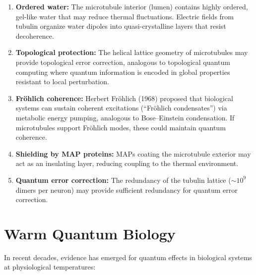 \documentclass[11pt,a4paper]{report}
\begin{document}
\begin{mechbox}
\begin{enumerate}[leftmargin=1.5em]
  \item \textbf{Ordered water:} The microtubule interior (lumen) contains highly ordered, gel-like water that may reduce thermal fluctuations. Electric fields from tubulin organize water dipoles into quasi-crystalline layers that resist decoherence.
  \item \textbf{Topological protection:} The helical lattice geometry of microtubules may provide topological error correction, analogous to topological quantum computing where quantum information is encoded in global properties resistant to local perturbation.
  \item \textbf{Fr\"ohlich coherence:} Herbert Fr\"ohlich (1968) proposed that biological systems can sustain coherent excitations (``Fr\"ohlich condensates'') via metabolic energy pumping, analogous to Bose--Einstein condensation. If microtubules support Fr\"ohlich modes, these could maintain quantum coherence.
  \item \textbf{Shielding by MAP proteins:} MAPs coating the microtubule exterior may act as an insulating layer, reducing coupling to the thermal environment.
  \item \textbf{Quantum error correction:} The redundancy of the tubulin lattice ($\sim 10^9$ dimers per neuron) may provide sufficient redundancy for quantum error correction.
\end{enumerate}
\end{mechbox}

\section{Warm Quantum Biology}

In recent decades, evidence has emerged for quantum effects in biological systems at physiological temperatures:
\end{document}
